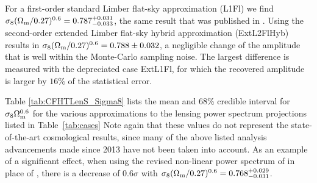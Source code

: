For a first-order standard Limber flat-sky approximation (L1Fl) we find
$\sigma_8 (\Omega_{\rm m}/0.27)^{0.6} =0.787^{+0.031}_{-0.033}$, the same
result that was published in \cite{CFHTLenS-2pt-notomo}. Using the second-order
extended Limber flat-sky hybrid approximation (ExtL2FlHyb) results in $\sigma_8
(\Omega_{\rm m}/0.27)^{0.6} = 0.788 \pm 0.032$, a negligible change of the
amplitude that is well within the Monte-Carlo sampling noise. The largest
difference is measured with the depreciated case ExtL1Fl, for which the
recovered amplitude is larger by $16\%$ of the statistical error. 

Table \ref{tab:CFHTLenS_Sigma8} lists the mean and 68\% credible interval for
$\sigma_8 \Omega_{\rm m}^{0.6}$ for the various approximations to the
lensing power spectrum projections listed in Table~\ref{tab:cases} Note again
that these values do not represent the state-of-the-art cosmological results,
since many of the above listed analysis advancements made since 2013 have not
been taken into account. As an example of a significant effect, when using the
revised non-linear power spectrum of \cite{2012ApJ...761..152T} in place of
\cite{2003MNRAS.341.1311S}, there is a decrease of $0.6 \sigma$ with $\sigma_8
(\Omega_{\rm m}/0.27)^{0.6} =0.768^{+0.029}_{-0.031}$.





